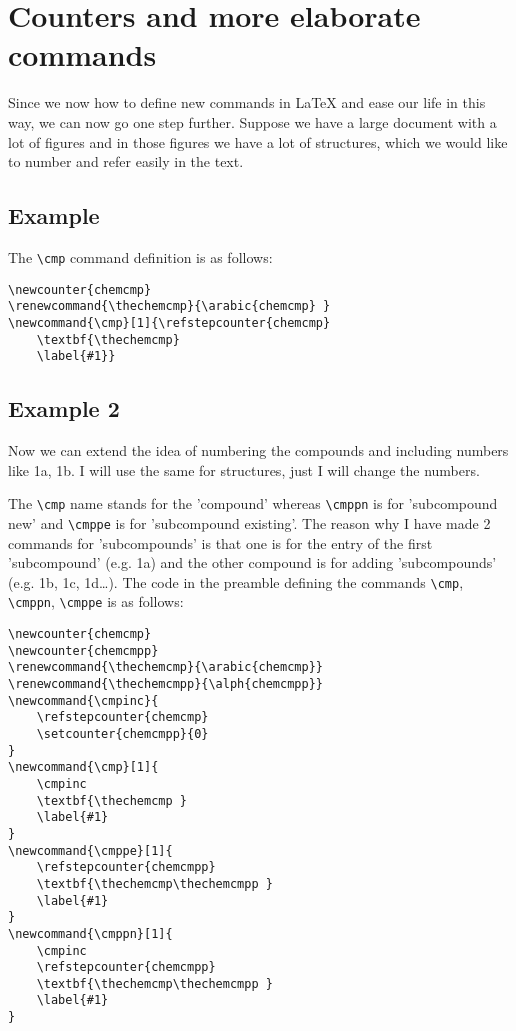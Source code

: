 \documentclass{scrartcl}
\newcounter{chemcmp}
\newcounter{chemcmpp}
\renewcommand{\thechemcmp}{\arabic{chemcmp}}
\renewcommand{\thechemcmpp}{\alph{chemcmpp}}
\newcommand{\cmpinc}{
    \refstepcounter{chemcmp}
    \setcounter{chemcmpp}{0}
}
\newcommand{\cmp}[1]{
    \cmpinc
    \textbf{\thechemcmp }
    \label{#1}
}
\newcommand{\cmppe}[1]{
    \refstepcounter{chemcmpp}
    \textbf{\thechemcmp\thechemcmpp }
    \label{#1}
}
\newcommand{\cmppn}[1]{
    \cmpinc
    \refstepcounter{chemcmpp}
    \textbf{\thechemcmp\thechemcmpp }
    \label{#1}
}
\begin{document}
\section{Counters and more elaborate commands}

Since we now how to define new commands in \LaTeX{} and ease our life in this
way, we can now go one step further. Suppose we have a large document with a lot
of figures and in those figures we have a lot of structures, which we would like
to number and refer easily in the text. 

\subsection{Example}




The \verb|\cmp| command definition is as follows:
\begin{lstlisting}
\newcounter{chemcmp}
\renewcommand{\thechemcmp}{\arabic{chemcmp} }
\newcommand{\cmp}[1]{\refstepcounter{chemcmp}
    \textbf{\thechemcmp}
    \label{#1}}
\end{lstlisting}

\subsection{Example 2}

Now we can extend the idea of numbering the compounds and including numbers like
1a, 1b. I will use the same for structures, just I will change the numbers.




The \verb|\cmp| name stands for the 'compound'
whereas \verb|\cmppn| is for 'subcompound new' and \verb|\cmppe| is for
'subcompound existing'. The reason why I have made 2 commands for 'subcompounds'
is that one is for the entry of the first 'subcompound' (e.g. 1a) and the other
compound is for adding 'subcompounds' (e.g. 1b, 1c, 1d\ldots).
The code in the preamble defining the commands \verb|\cmp|, \verb|\cmppn|,
\verb|\cmppe| is as follows:
\begin{lstlisting}
\newcounter{chemcmp}
\newcounter{chemcmpp}
\renewcommand{\thechemcmp}{\arabic{chemcmp}}
\renewcommand{\thechemcmpp}{\alph{chemcmpp}}
\newcommand{\cmpinc}{
    \refstepcounter{chemcmp}
    \setcounter{chemcmpp}{0}
}
\newcommand{\cmp}[1]{
    \cmpinc
    \textbf{\thechemcmp }
    \label{#1}
}
\newcommand{\cmppe}[1]{
    \refstepcounter{chemcmpp}
    \textbf{\thechemcmp\thechemcmpp }
    \label{#1}
}
\newcommand{\cmppn}[1]{
    \cmpinc
    \refstepcounter{chemcmpp}
    \textbf{\thechemcmp\thechemcmpp }
    \label{#1}
}
\end{lstlisting}
\end{document}
